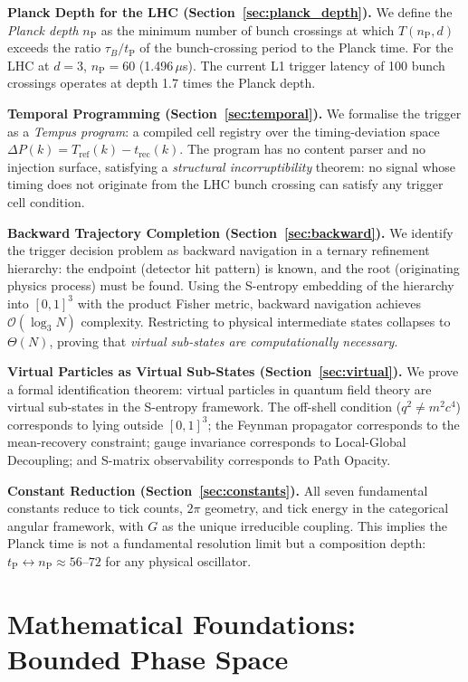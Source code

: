 \documentclass[twocolumn,10pt,a4paper]{article}
\theoremstyle{thmstyle}
\theoremstyle{definition}
\theoremstyle{remark}
\newcommand{\tP}{t_{\mathrm{P}}}
\newcommand{\nP}{n_{\mathrm{P}}}
\newcommand{\dP}{\Delta P}
\begin{document}
\textbf{Planck Depth for the LHC (Section~\ref{sec:planck_depth}).}
We define the \emph{Planck depth} $\nP$ as the minimum number of bunch
crossings at which $T(\nP, d)$ exceeds the ratio $\tau_B / \tP$ of
the bunch-crossing period to the Planck time. For the LHC at $d = 3$,
$\nP = 60$ (1.496\,$\mu$s). The current L1 trigger latency of 100
bunch crossings operates at depth 1.7 times the Planck depth.

\textbf{Temporal Programming (Section~\ref{sec:temporal}).}
We formalise the trigger as a \emph{Tempus program}: a compiled cell
registry over the timing-deviation space $\dP(k) = T_{\mathrm{ref}}(k)
- t_{\mathrm{rec}}(k)$. The program has no content parser and no
injection surface, satisfying a \emph{structural incorruptibility}
theorem: no signal whose timing does not originate from the LHC bunch
crossing can satisfy any trigger cell condition.

\textbf{Backward Trajectory Completion (Section~\ref{sec:backward}).}
We identify the trigger decision problem as backward navigation in a
ternary refinement hierarchy: the endpoint (detector hit pattern) is
known, and the root (originating physics process) must be found. Using
the S-entropy embedding of the hierarchy into $[0,1]^3$ with the
product Fisher metric, backward navigation achieves
$\mathcal{O}(\log_3 N)$ complexity. Restricting to physical
intermediate states collapses to $\Theta(N)$, proving that
\emph{virtual sub-states are computationally necessary}.

\textbf{Virtual Particles as Virtual Sub-States (Section~\ref{sec:virtual}).}
We prove a formal identification theorem: virtual particles in quantum
field theory are virtual sub-states in the S-entropy framework. The
off-shell condition ($q^2 \neq m^2 c^4$) corresponds to lying outside
$[0,1]^3$; the Feynman propagator corresponds to the mean-recovery
constraint; gauge invariance corresponds to Local-Global Decoupling;
and S-matrix observability corresponds to Path Opacity.

\textbf{Constant Reduction (Section~\ref{sec:constants}).}
All seven fundamental constants reduce to tick counts, $2\pi$ geometry,
and tick energy in the categorical angular framework, with $G$ as the
unique irreducible coupling. This implies the Planck time is not a
fundamental resolution limit but a composition depth: $\tP
\leftrightarrow \nP \approx 56$--$72$ for any physical oscillator.

\section{Mathematical Foundations: Bounded Phase Space}
\label{sec:foundations}
\end{document}
